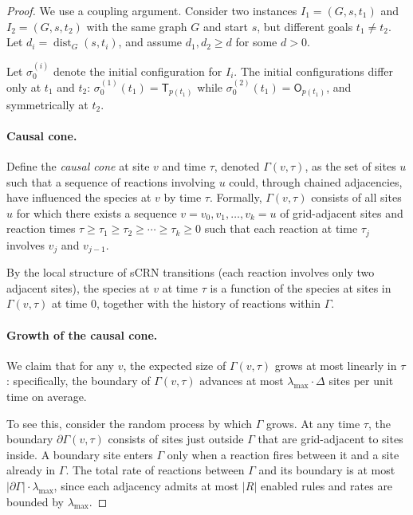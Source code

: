 \documentclass[11pt]{article}
\theoremstyle{plain}
\theoremstyle{definition}
\theoremstyle{remark}
\DeclareMathOperator{\dist}{dist}
\begin{document}
\begin{proof}
We use a coupling argument. Consider two instances $I_1 = (G, s, t_1)$ and $I_2 = (G, s, t_2)$ with the same graph $G$ and start $s$, but different goals $t_1 \neq t_2$. Let $d_i = \dist_G(s, t_i)$, and assume $d_1, d_2 \geq d$ for some $d > 0$.

Let $\sigma^{(i)}_0$ denote the initial configuration for $I_i$. The initial configurations differ only at $t_1$ and $t_2$: $\sigma^{(1)}_0(t_1) = \mathsf{T}_{p(t_1)}$ while $\sigma^{(2)}_0(t_1) = \mathsf{O}_{p(t_1)}$, and symmetrically at $t_2$.

\paragraph{Causal cone.} Define the \emph{causal cone} at site $v$ and time $\tau$, denoted $\Gamma(v, \tau)$, as the set of sites $u$ such that a sequence of reactions involving $u$ could, through chained adjacencies, have influenced the species at $v$ by time $\tau$. Formally, $\Gamma(v, \tau)$ consists of all sites $u$ for which there exists a sequence $v = v_0, v_1, \ldots, v_k = u$ of grid-adjacent sites and reaction times $\tau \geq \tau_1 \geq \tau_2 \geq \cdots \geq \tau_k \geq 0$ such that each reaction at time $\tau_j$ involves $v_j$ and $v_{j-1}$.

By the local structure of sCRN transitions (each reaction involves only two adjacent sites), the species at $v$ at time $\tau$ is a function of the species at sites in $\Gamma(v, \tau)$ at time $0$, together with the history of reactions within $\Gamma$.

\paragraph{Growth of the causal cone.} We claim that for any $v$, the expected size of $\Gamma(v, \tau)$ grows at most linearly in $\tau$: specifically, the boundary of $\Gamma(v, \tau)$ advances at most $\lambda_{\max} \cdot \Delta$ sites per unit time on average.

To see this, consider the random process by which $\Gamma$ grows. At any time $\tau$, the boundary $\partial \Gamma(v, \tau)$ consists of sites just outside $\Gamma$ that are grid-adjacent to sites inside. A boundary site enters $\Gamma$ only when a reaction fires between it and a site already in $\Gamma$. The total rate of reactions between $\Gamma$ and its boundary is at most $|\partial \Gamma| \cdot \lambda_{\max}$, since each adjacency admits at most $|R|$ enabled rules and rates are bounded by $\lambda_{\max}$.


\end{proof}
\end{document}
